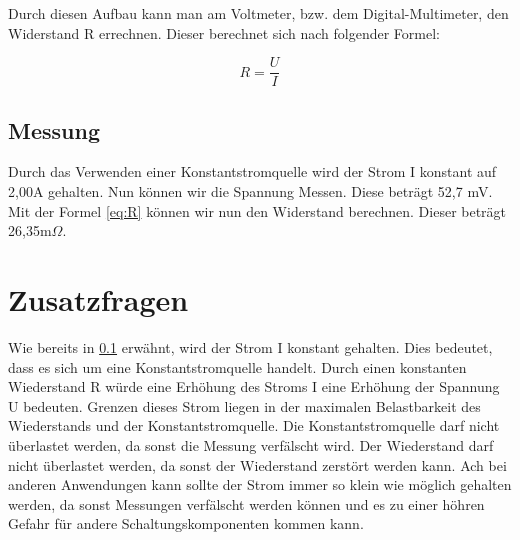 Durch diesen Aufbau kann man am Voltmeter, bzw. dem Digital-Multimeter,
den Widerstand R errechnen. Dieser berechnet sich nach folgender Formel:

\begin{equation}
    R = \frac{U}{I}
    \label{eq:R}
\end{equation}

\subsection{Messung}
\label{subsec:Messung}
Durch das Verwenden einer Konstantstromquelle wird der Strom I konstant
auf 2,00A gehalten. Nun können wir die Spannung Messen. Diese beträgt
52,7 mV. Mit der Formel \ref*{eq:R} können wir nun den Widerstand
berechnen. Dieser beträgt 26,35m$\Omega$.

\section{Zusatzfragen}

Wie bereits in \ref{subsec:Messung} erwähnt, wird der Strom I konstant
gehalten. Dies bedeutet, dass es sich um eine Konstantstromquelle handelt.
Durch einen konstanten Wiederstand R würde eine Erhöhung des Stroms I
eine Erhöhung der Spannung U bedeuten. 
Grenzen dieses Strom liegen in der maximalen Belastbarkeit des Wiederstands
und der Konstantstromquelle. Die Konstantstromquelle darf nicht überlastet
werden, da sonst die Messung verfälscht wird. Der Wiederstand darf nicht
überlastet werden, da sonst der Wiederstand zerstört werden kann. 
Ach bei anderen Anwendungen kann sollte der Strom immer so klein wie möglich
gehalten werden, da sonst Messungen verfälscht werden können und es 
zu einer höhren Gefahr für andere Schaltungskomponenten kommen kann.


